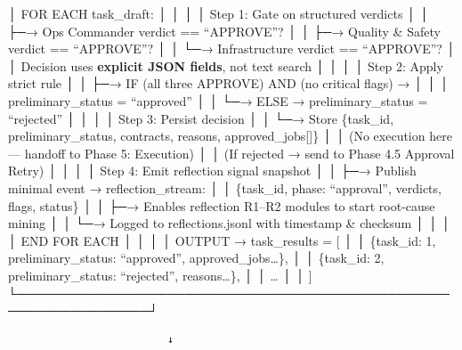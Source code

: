 \documentclass[
]{article}
\begin{document}
│ FOR EACH task\_draft: │ │ │ │ Step 1: Gate on structured verdicts │ │
├─→ Ops Commander verdict == ``APPROVE''? │ │ ├─→ Quality \& Safety
verdict == ``APPROVE''? │ │ └─→ Infrastructure verdict == ``APPROVE''? │
│ Decision uses \textbf{explicit JSON fields}, not text search │ │ │ │
Step 2: Apply strict rule │ │ ├─→ IF (all three APPROVE) AND (no
critical flags) → │ │ │ preliminary\_status = ``approved'' │ │ └─→ ELSE
→ preliminary\_status = ``rejected'' │ │ │ │ Step 3: Persist decision │
│ └─→ Store \{task\_id, preliminary\_status, contracts, reasons,
approved\_jobs{[}{]}\} │ │ (No execution here --- handoff to Phase 5:
Execution) │ │ (If rejected → send to Phase 4.5 Approval Retry) │ │ │ │
Step 4: Emit reflection signal snapshot │ │ ├─→ Publish minimal event →
reflection\_stream: │ │ \{task\_id, phase: ``approval'', verdicts,
flags, status\} │ │ ├─→ Enables reflection R1--R2 modules to start
root-cause mining │ │ └─→ Logged to reflections.jsonl with timestamp \&
checksum │ │ │ │ END FOR EACH │ │ │ │ OUTPUT → task\_results = {[} │ │
\{task\_id: 1, preliminary\_status: ``approved'',
approved\_jobs\ldots\}, │ │ \{task\_id: 2, preliminary\_status:
``rejected'', reasons\ldots\}, │ │ \ldots{} │ │ {]}
└─────────────────────────────────────────────────────────────────┘

\begin{verbatim}
                         ↓
\end{verbatim}
\end{document}
